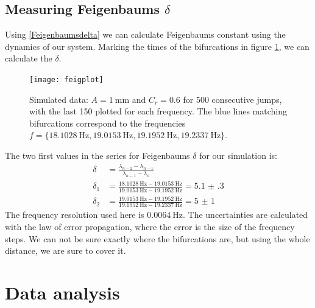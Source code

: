 \documentclass[12pt,oneside,a4paper]{article}
\numberwithin{equation}{section}
\begin{document}
{{{{\subsection{Measuring Feigenbaums $\delta$}
Using \eqref{Feigenbaumsdelta} we can calculate Feigenbaums constant using the dynamics of our system. Marking the times of the bifurcations in figure  \ref{feigsim}, we can calculate the $\delta$.
\begin{figure}[h]
\centering
\texttt{[image: feigplot]} 
\caption{Simulated data: $A=\SI{1}{\mm}$ and $C_r=\num{0.6}$ for 500 consecutive jumps, with the last 150 plotted for each frequency. The blue lines matching bifurcations correspond to the frequencies $f=\{\SI{18.1028}{\hertz},\SI{19.0153}{\hertz},\SI{19.1952}{\hertz},\SI{19.2337}{\hertz} \}$.}\label{feigsim}
\end{figure}
The two first values in the series for Feigenbaums $\delta$ for our simulation is:
\begin{align}
\delta&=\frac{\lambda_{n-2} - \lambda_{n-1}}{\lambda_{n-1}-\lambda_n}\\
\delta_1&=\frac{\SI{18.1028}{\hertz}-\SI{19.0153}{\hertz}}{\SI{19.0153}{\hertz}-\SI{19.1952}{\hertz}} = \num{5.1(3)}\\
\delta_2&=\frac{\SI{19.0153}{\hertz}-\SI{19.1952}{\hertz}}{\SI{19.1952}{\hertz}-\SI{19.2337}{\hertz}} = \num{5(1)}
\end{align}
The frequency resolution used here is $\SI{0.0064}{\hertz}$. The uncertainties are calculated with the law of error propagation, where the error is the size of the frequency steps. We can not be sure exactly where the bifurcations are, but using the whole distance, we are sure to cover it.  
\section{Data analysis}
}}}}
\end{document}
